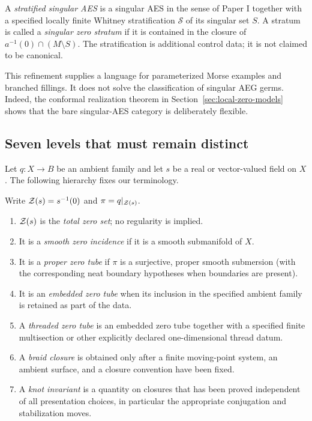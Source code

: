 \begin{definition}
\label{def:stratified-singular-aes}
A \emph{stratified singular AES} is a singular AES in the sense of Paper I together
with a specified locally finite Whitney stratification $\mathcal S$ of its singular
set $S$.  A stratum is called a \emph{singular zero stratum} if it is contained in
the closure of $a^{-1}(0)\cap(M\setminus S)$.  The stratification is additional
control data; it is not claimed to be canonical.
\end{definition}

This refinement supplies a language for parameterized Morse examples and branched
fillings.  It does not solve the classification of singular AEG germs.  Indeed, the
conformal realization theorem in Section~\ref{sec:local-zero-models} shows that the
bare singular-AES category is deliberately flexible.

\subsection{Seven levels that must remain distinct}

Let $q:X\to B$ be an ambient family and let $s$ be a real or vector-valued field on
$X$.  The following hierarchy fixes our terminology.

\begin{definition}
\label{def:zero-object-hierarchy}
Write $\mathcal Z(s)=s^{-1}(0)$ and $\pi=q|_{\mathcal Z(s)}$.
\begin{enumerate}
\item $\mathcal Z(s)$ is the \emph{total zero set}; no regularity is implied.
\item It is a \emph{smooth zero incidence} if it is a smooth submanifold of $X$.
\item It is a \emph{proper zero tube} if $\pi$ is a surjective, proper smooth
  submersion (with the corresponding neat boundary hypotheses when boundaries are
  present).
\item It is an \emph{embedded zero tube} when its inclusion in the specified
  ambient family is retained as part of the data.
\item A \emph{threaded zero tube} is an embedded zero tube together with a specified
  finite multisection or other explicitly declared one-dimensional thread datum.
\item A \emph{braid closure} is obtained only after a finite moving-point system,
  an ambient surface, and a closure convention have been fixed.
\item A \emph{knot invariant} is a quantity on closures that has been proved
  independent of all presentation choices, in particular the appropriate
  conjugation and stabilization moves.
\end{enumerate}
\end{definition}

